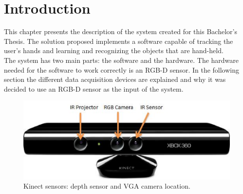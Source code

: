 \section{Introduction}

This chapter presents the description of the system created for this Bachelor's Thesis. The solution proposed implements a software capable of tracking the user's hands and learning and recognizing the objects that are hand-held. 
\\
The system has two main parts: the software and the hardware. 
The hardware needed for the software to work correctly is an RGB-D sensor. In the following section the different data acquisition devices are explained and why it was decided to use an RGB-D sensor as the input of the system. 

 
\begin{figure}[h]
	\begin{center}
\includegraphics[scale=0.5]{img/kinect/kinect2.eps}
	\caption[Kinect Sensors]{Kinect sensors: depth sensor and VGA camera location.}
	\end{center}
\end{figure}
